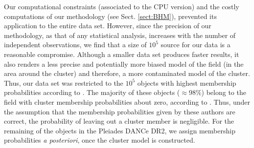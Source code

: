 Our computational constraints (associated to the CPU version) and the costly computations of our methodology (see Sect. \ref{sect:BHM}), prevented its application to the entire data set. However, since the precision of our methodology, as that of any statistical analysis, increases with the number of independent observations, we find that a size of $10^5$ source for our data is a reasonable compromise. Although a smaller data set produces faster results, it also renders a less precise and potentially more biased model of the field (in the area around the cluster) and therefore, a more contaminated model of the cluster. Thus, our data set was restricted to the $10^5$ objects with highest membership probabilities according to \citet{Bouy2015}. The majority of these objects ($\approx$98\%) belong to the field with cluster membership probabilities about zero, according to \citet{Sarro2014,Bouy2015}. Thus, under the assumption that the membership probabilities given by these authors are correct, the probability of leaving out a cluster member is negligible. For the remaining of the objects in the Pleiades DANCe DR2, we assign membership probabilities \emph{a posteriori}, once the cluster model is constructed. 



